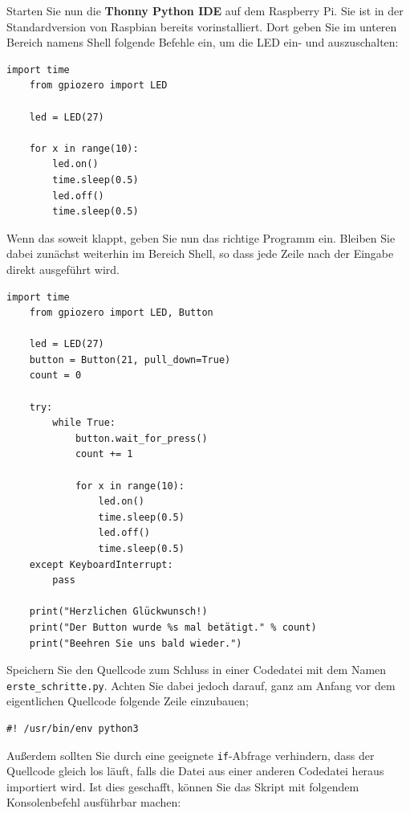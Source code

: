 \teilaufgabe
Starten Sie nun die \textbf{Thonny Python IDE} auf dem Raspberry Pi. Sie ist
in der Standardversion von Raspbian bereits vorinstalliert. Dort geben Sie im
unteren Bereich namens \glqq{}Shell\grqq{} folgende Befehle ein, um die LED ein-
und auszuschalten:

\begin{Verbatim}[gobble=4]
    import time
    from gpiozero import LED

    led = LED(27)

    for x in range(10):
        led.on()
        time.sleep(0.5)
        led.off()
        time.sleep(0.5)
\end{Verbatim}

\bigskip
\teilaufgabe
Wenn das soweit klappt, geben Sie nun das richtige Programm ein. Bleiben Sie
dabei zunächst weiterhin im Bereich \glqq{}Shell\grqq{}, so dass jede Zeile
nach der Eingabe direkt ausgeführt wird.

\begin{Verbatim}[gobble=4]
    import time
    from gpiozero import LED, Button

    led = LED(27)
    button = Button(21, pull_down=True)
    count = 0

    try:
        while True:
            button.wait_for_press()
            count += 1

            for x in range(10):
                led.on()
                time.sleep(0.5)
                led.off()
                time.sleep(0.5)
    except KeyboardInterrupt:
        pass

    print("Herzlichen Glückwunsch!)
    print("Der Button wurde %s mal betätigt." % count)
    print("Beehren Sie uns bald wieder.")
\end{Verbatim}

\bigskip
\teilaufgabe
Speichern Sie den Quellcode zum Schluss in einer Codedatei mit dem Namen
\texttt{erste\_schritte.py}. Achten Sie dabei jedoch darauf, ganz am Anfang vor
dem eigentlichen Quellcode folgende Zeile einzubauen;

\begin{Verbatim}[gobble=4]
    #! /usr/bin/env python3
\end{Verbatim}

Außerdem sollten Sie durch eine geeignete \texttt{if}-Abfrage verhindern, dass
der Quellcode gleich los läuft, falls die Datei aus einer anderen Codedatei
heraus importiert wird. Ist dies geschafft, können Sie das Skript mit folgendem
Konsolenbefehl ausführbar machen:

